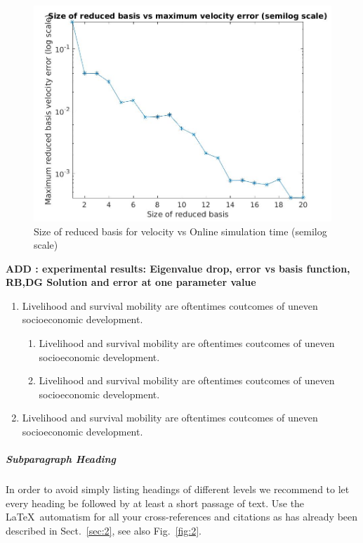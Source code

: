 \documentclass[graybox]{svmult}
\begin{document}
\begin{figure}
  \includegraphics[width=\linewidth]{size_vs_maximum_reduced_basis_velocity_error_semilog.jpg}
  \caption{Size of reduced basis for velocity vs Online simulation time (semilog scale)} 
\label{online_simulation_time}
\end{figure}

\textbf{ADD : experimental results: Eigenvalue drop, error vs basis function, RB,DG Solution and error at one parameter value}

\begin{enumerate}
\item{Livelihood and survival mobility are oftentimes coutcomes of uneven socioeconomic development.}
\begin{enumerate}
\item{Livelihood and survival mobility are oftentimes coutcomes of uneven socioeconomic development.}
\item{Livelihood and survival mobility are oftentimes coutcomes of uneven socioeconomic development.}
\end{enumerate}
\item{Livelihood and survival mobility are oftentimes coutcomes of uneven socioeconomic development.}
\end{enumerate}


\subparagraph{Subparagraph Heading} In order to avoid simply listing headings of different levels we recommend to let every heading be followed by at least a short passage of text. Use the \LaTeX\ automatism for all your cross-references and citations as has already been described in Sect.~\ref{sec:2}, see also Fig.~\ref{fig:2}.
\end{document}
